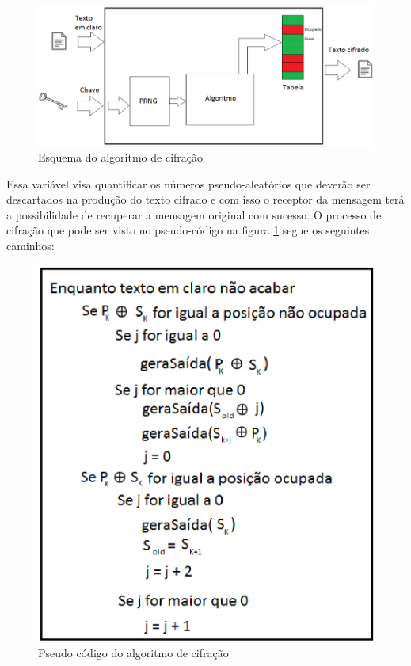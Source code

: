 \begin{figure}[h]
	\centering
	\includegraphics[scale=0.6]{figuras/funcionamento.eps}
	\caption{Esquema do algoritmo de cifração}
\end{figure}

Essa variável visa quantificar os números pseudo-aleatórios que deverão ser descartados na produção do texto cifrado e com isso o receptor da mensagem terá a possibilidade de recuperar a mensagem original com sucesso. O processo de cifração que pode ser visto no pseudo-código na figura \ref{pseudo-codigo} segue os seguintes caminhos:

\begin{figure}[h]
	\centering
	\includegraphics[scale=1]{figuras/pseudocondigo.eps}
	\caption{Pseudo código do algoritmo de cifração}
	\label{pseudo-codigo}
\end{figure}

